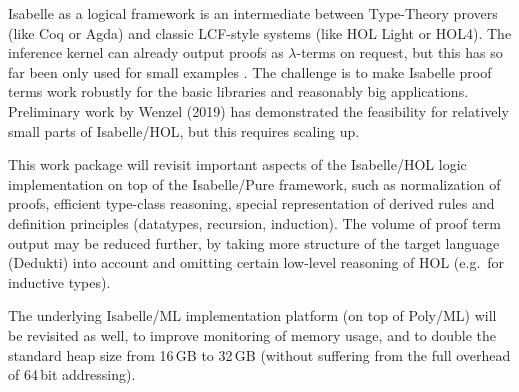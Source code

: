 

Isabelle as a logical framework \cite{paulson700} is an intermediate
between Type-Theory provers (like Coq or Agda) and classic LCF-style
systems (like HOL Light or HOL4). The inference kernel can already
output proofs as $\lambda$-terms on request, but this has so far been
only used for small examples \cite{Berghofer-Nipkow:2000:TPHOL}. The
challenge is to make Isabelle proof terms work robustly for the basic
libraries and reasonably big applications.  Preliminary work by Wenzel
(2019) has demonstrated the feasibility for relatively small parts of
Isabelle/HOL, but this requires scaling up.

This work package will revisit important aspects of the Isabelle/HOL
logic implementation on top of the Isabelle/Pure framework, such as
normalization of proofs, efficient type-class reasoning, special
representation of derived rules and definition principles (datatypes,
recursion, induction). The volume of proof term output may be reduced
further, by taking more structure of the target language (Dedukti)
into account and omitting certain low-level reasoning of HOL (e.g.\
for inductive types).

The underlying Isabelle/ML implementation platform (on top of Poly/ML)
will be revisited as well, to improve monitoring of memory usage, and
to double the standard heap size from 16\,GB to 32\,GB (without
suffering from the full overhead of 64\,bit addressing).
